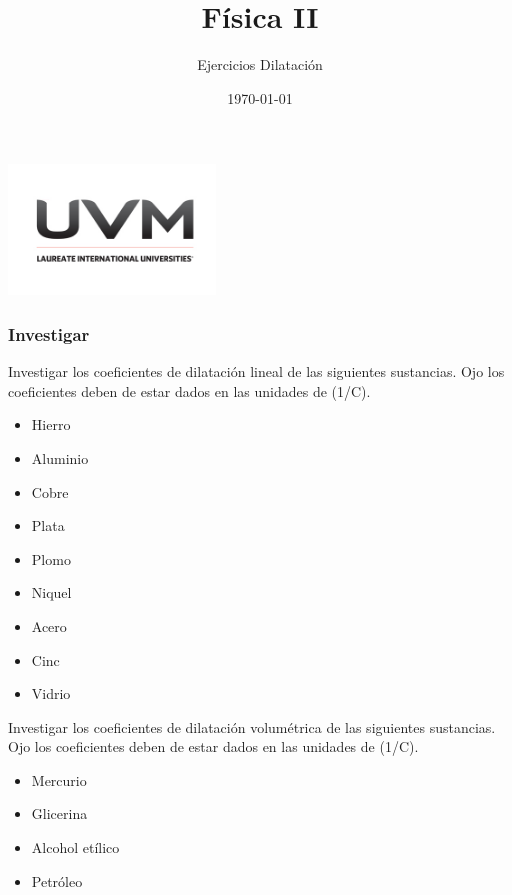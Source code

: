 \documentclass[handout]{beamer}
\title{Física II}
\author{Ejercicios Dilatación}
\institute[UVM]{4\textdegree \hspace{2pt} cuatrimestre.}
\date{\today}
\begin{document}
\begin{frame}[noframenumbering]
  \titlepage
  \begin{center}
    \includegraphics[width=5.5cm]{uvm1}    
  \end{center}  
\end{frame}


\begin{frame}[allowframebreaks,t]
  \frametitle{Investigar}
  \begin{block}{ }
    Investigar los coeficientes de dilatación lineal de las siguientes sustancias. Ojo los
    coeficientes deben de estar dados en las unidades de (1/\textdegree C).
    \begin{itemize}
    \item  Hierro
    \item Aluminio
    \item Cobre
    \item Plata
    \item Plomo
    \item Niquel
    \item Acero
    \item Cinc
    \item Vidrio
    \end{itemize}
    \end{block}

    \begin{block}
      
    Investigar los coeficientes de dilatación volumétrica de las siguientes sustancias. Ojo los
    coeficientes deben de estar dados en las unidades de (1/\textdegree C).
    \begin{itemize}
    \item Mercurio
    \item Glicerina
    \item Alcohol etílico
    \item Petróleo
    \end{itemize}
  \end{block}
  

\end{frame}
\end{document}
